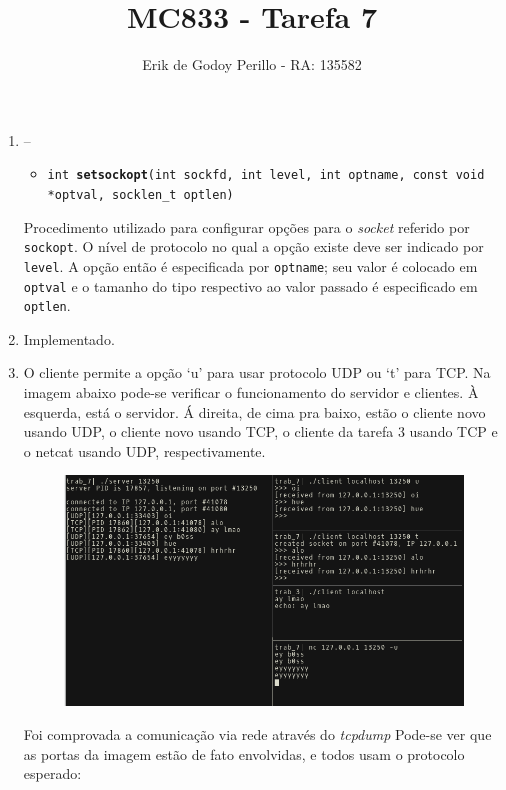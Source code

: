 \documentclass[10pt]{article}
\newcommand{\tit}[1]{\textit{#1}}
\newcommand{\tbf}[1]{\textbf{#1}}
\newcommand{\ttt}[1]{\texttt{#1}}
\begin{document}
\title{MC833 - Tarefa 7}
\author{Erik de Godoy Perillo - RA: 135582}
\maketitle

\begin{enumerate}
\item --
	\begin{itemize}
		\item \ttt{int \tbf{setsockopt}(int sockfd, int level, int optname,
			const void *optval, socklen\_t optlen)}
	\end{itemize}

	Procedimento utilizado para configurar opções para o \tit{socket}
	referido por \ttt{sockopt}. O nível de protocolo no qual a opção existe
	deve ser indicado por \ttt{level}. A opção então é especificada por 
	\ttt{optname}; seu valor é colocado em \ttt{optval} e o tamanho do 
	tipo respectivo ao valor passado é especificado em \ttt{optlen}.

\item Implementado.

\item O cliente permite a opção `u' para usar protocolo UDP ou `t' 
	para TCP\@. Na imagem abaixo pode-se verificar o funcionamento 
	do servidor e clientes. À esquerda, está o servidor. 
	Á direita, de cima pra baixo, estão o cliente novo usando UDP,
	o cliente novo usando TCP, o cliente da tarefa 3 usando TCP e o
	netcat usando UDP, respectivamente.

	\begin{figure}[H]
	\centering
	\includegraphics[width=1.0\linewidth]{imgs/q3.png}
	\end{figure}

	Foi comprovada a comunicação via rede através do \tit{tcpdump} Pode-se
	ver que as portas da imagem estão de fato envolvidas, e todos usam o
	protocolo esperado:


\end{enumerate}
\end{document}
